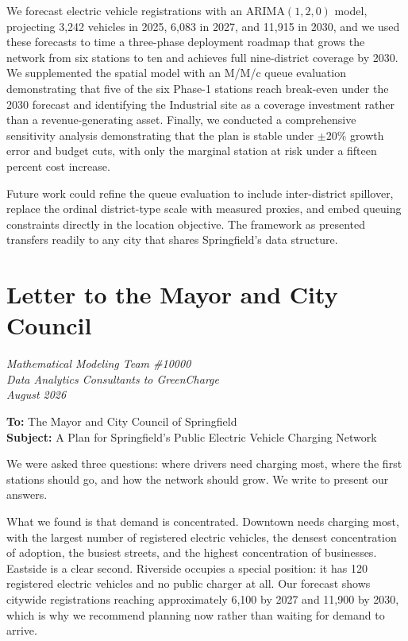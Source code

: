 \documentclass[11pt]{article}
\begin{document}
We forecast electric vehicle registrations with an ARIMA$(1,2,0)$ model, projecting 3{,}242 vehicles in 2025, 6{,}083 in 2027, and 11{,}915 in 2030, and we used these forecasts to time a three-phase deployment roadmap that grows the network from six stations to ten and achieves full nine-district coverage by 2030. We supplemented the spatial model with an M/M/c queue evaluation demonstrating that five of the six Phase-1 stations reach break-even under the 2030 forecast and identifying the Industrial site as a coverage investment rather than a revenue-generating asset. Finally, we conducted a comprehensive sensitivity analysis demonstrating that the plan is stable under $\pm 20\%$ growth error and budget cuts, with only the marginal station at risk under a fifteen percent cost increase.

Future work could refine the queue evaluation to include inter-district spillover, replace the ordinal district-type scale with measured proxies, and embed queuing constraints directly in the location objective. The framework as presented transfers readily to any city that shares Springfield's data structure.

\newpage
\section*{Letter to the Mayor and City Council}

\begin{center}
\emph{Mathematical Modeling Team \#10000}\\
\emph{Data Analytics Consultants to GreenCharge}\\
\emph{August 2026}
\end{center}

\noindent\textbf{To:} The Mayor and City Council of Springfield\\
\textbf{Subject:} A Plan for Springfield's Public Electric Vehicle Charging Network

\vspace{6pt}

We were asked three questions: where drivers need charging most, where the first stations should go, and how the network should grow. We write to present our answers.

What we found is that demand is concentrated. Downtown needs charging most, with the largest number of registered electric vehicles, the densest concentration of adoption, the busiest streets, and the highest concentration of businesses. Eastside is a clear second. Riverside occupies a special position: it has 120 registered electric vehicles and no public charger at all. Our forecast shows citywide registrations reaching approximately 6{,}100 by 2027 and 11{,}900 by 2030, which is why we recommend planning now rather than waiting for demand to arrive.
\end{document}
